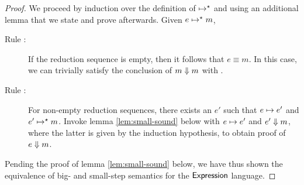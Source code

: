 \begin{proof}
\noindent We proceed by induction over the definition of $\mapsto^\star$ and using
an additional lemma that we state and prove afterwards. Given $e \mapsto^\star m$,
\begin{description}
\item[Rule :]%
If the reduction sequence is empty, then it follows that $e \equiv m$. In
this case, we can trivially satisfy the conclusion of $m \Downarrow m$ with
.
\item[Rule :]%
For non-empty reduction sequences, there exists an $e'$ such that $e \mapsto
e'$ and $e' \mapsto^\star m$. Invoke lemma \ref{lem:small-sound} below with $e
\mapsto e'$ and $e' \Downarrow m$, where the latter is given by the induction
hypothesis, to obtain proof of $e \Downarrow m$.
\end{description}
Pending the proof of lemma \ref{lem:small-sound} below, we have thus shown
the equivalence of big- and small-step semantics for the $\textsf{Expression}$
language.
\end{proof}

